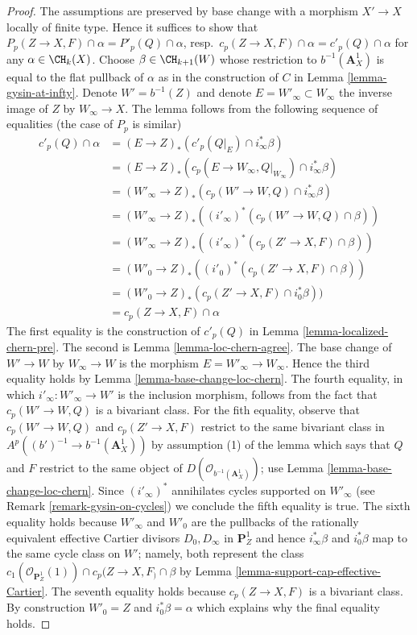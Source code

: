\begin{proof}
The assumptions are preserved by base change with a morphism
$X' \to X$ locally of finite type. Hence it suffices to show that
$P_p(Z \to X, F) \cap \alpha = P'_p(Q) \cap \alpha$,
resp.\ $c_p(Z \to X, F) \cap \alpha = c'_p(Q) \cap \alpha$
for any $\alpha \in \CH_k(X)$. Choose $\beta \in \CH_{k + 1}(W)$
whose restriction to $b^{-1}(\mathbf{A}^1_X)$ is equal to
the flat pullback of $\alpha$ as in the construction of
$C$ in Lemma \ref{lemma-gysin-at-infty}.
Denote $W' = b^{-1}(Z)$ and denote
$E = W'_\infty \subset W_\infty$ the inverse image of $Z$
by $W_\infty \to X$.
The lemma follows from
the following sequence of equalities (the case of $P_p$ is similar)
\begin{align*}
c'_p(Q) \cap \alpha
& =
(E \to Z)_*(c'_p(Q|_E) \cap i_\infty^*\beta) \\
& =
(E \to Z)_*(c_p(E \to W_\infty, Q|_{W_\infty}) \cap i_\infty^*\beta) \\
& =
(W'_\infty \to Z)_*(c_p(W' \to W, Q) \cap i_\infty^*\beta) \\
& =
(W'_\infty \to Z)_*((i'_\infty)^*(c_p(W' \to W, Q) \cap \beta)) \\
& =
(W'_\infty \to Z)_*((i'_\infty)^*(c_p(Z' \to X, F) \cap \beta)) \\
& =
(W'_0 \to Z)_*((i'_0)^*(c_p(Z' \to X, F) \cap \beta)) \\
& =
(W'_0 \to Z)_*(c_p(Z' \to X, F) \cap i_0^*\beta)) \\
& =
c_p(Z \to X, F) \cap \alpha
\end{align*}
The first equality is the construction of $c'_p(Q)$ in
Lemma \ref{lemma-localized-chern-pre}.
The second is Lemma \ref{lemma-loc-chern-agree}.
The base change of $W' \to W$ by $W_\infty \to W$ is the
morphism $E = W'_\infty \to W_\infty$. Hence the third equality holds
by Lemma \ref{lemma-base-change-loc-chern}. The fourth
equality, in which $i'_\infty : W'_\infty \to W'$ is the
inclusion morphism, follows from the fact that $c_p(W' \to W, Q)$
is a bivariant class. For the fith equality, observe that
$c_p(W' \to W, Q)$ and $c_p(Z' \to X, F)$
restrict to the same bivariant class in
$A^p((b')^{-1} \to b^{-1}(\mathbf{A}^1_X))$ by
assumption (1) of the lemma which says that $Q$ and $F$ restrict
to the same object of $D(\mathcal{O}_{b^{-1}(\mathbf{A}^1_X)})$;
use Lemma \ref{lemma-base-change-loc-chern}.
Since $(i'_\infty)^*$ annihilates cycles supported on $W'_\infty$
(see Remark \ref{remark-gysin-on-cycles}) we conclude the fifth equality
is true. The sixth equality holds because $W'_\infty$ and $W'_0$
are the pullbacks of the rationally equivalent effective Cartier divisors
$D_0, D_\infty$ in $\mathbf{P}^1_Z$ and hence $i_\infty^*\beta$ and
$i_0^*\beta$ map to the same cycle class on $W'$; namely, both
represent the class
$c_1(\mathcal{O}_{\mathbf{P}^1_Z}(1)) \cap c_p(Z \to X, F_) \cap \beta$ by
Lemma \ref{lemma-support-cap-effective-Cartier}.
The seventh equality holds because $c_p(Z \to X, F)$ is
a bivariant class. By construction $W'_0 = Z$ and $i_0^*\beta = \alpha$
which explains why the final equality holds.
\end{proof}







